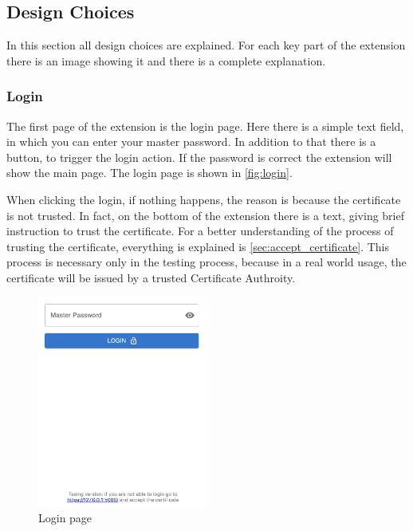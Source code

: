 \subsection {Design Choices}

In this section all design choices are explained. For each key part of the extension there is an image showing it and there is a complete explanation.

\subsubsection{Login}

The first page of the extension is the login page. Here there is a simple text field, in which you can enter your master password. In addition to that there is a button, to trigger the login action. If the password is correct the extension will show the main page.
The login page is shown in \autoref{fig:login}.

When clicking the login, if nothing happens, the reason is because the certificate is not trusted. In fact, on the bottom of the extension there is a text, giving brief instruction to trust the certificate. 
For a better understanding of the process of trusting the certificate, everything is explained is \autoref{sec:accept_certificate}.
This process is necessary only in the testing process, because in a real world usage, the certificate will be issued by a trusted Certificate Authroity.


\begin{figure}[h!]
    \centering
    \vspace{0.5cm}
    \includegraphics[width=0.5\textwidth]{images/extension/login.png}
    \caption{Login page}
    \label{fig:login} %
\end{figure}


